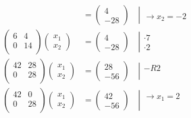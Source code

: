 \documentclass[11pt,fleqn]{book} %
\begin{document}
\begin{align}
&=\left(
\begin{matrix}
4 \\
-28
\end{matrix}\right) 
\quad \left|\begin{matrix}
 \\
\rightarrow x_2 = -2
\end{matrix}\right. \label{eq:gauss:3} \\
\left(\begin{matrix}
6 & 4 \\
0 & 14 \\
\end{matrix}\right)
\left(\begin{matrix}
x_1 \\
x_2
\end{matrix}\right)
&=\left(
\begin{matrix}
4 \\
-28
\end{matrix}\right) 
\quad \left|\begin{matrix}
\cdot 7 \\
\cdot 2
\end{matrix}\right. \label{eq:gauss:4} \\
\left(\begin{matrix}
42 & 28 \\
0 & 28 \\
\end{matrix}\right)
\left(\begin{matrix}
x_1 \\
x_2
\end{matrix}\right)
&=\left(
\begin{matrix}
28 \\
-56
\end{matrix}\right) 
\quad \left|\begin{matrix}
-R2 \\
 \\
\end{matrix}\right. \label{eq:gauss:5} 
\\
\left(\begin{matrix}
42 & 0 \\
0 & 28 \\
\end{matrix}\right)
\left(\begin{matrix}
x_1 \\
x_2
\end{matrix}\right)
&=\left(
\begin{matrix}
42 \\
-56
\end{matrix}\right) 
\quad \left|\begin{matrix}
\rightarrow x_1 = 2 \\
\\
\end{matrix}\right. \label{eq:gauss:6} 
\end{align}
\end{document}
